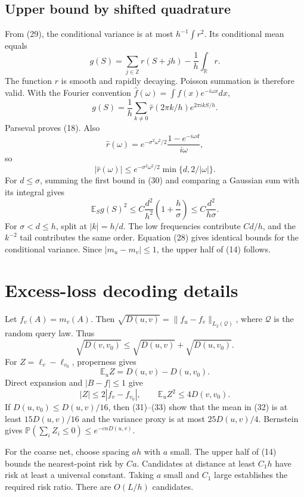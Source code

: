 \documentclass{article}
\theoremstyle{definition}
\theoremstyle{remark}
\newcommand{\E}{\mathbb E}
\newcommand{\Prb}{\mathbb P}
\newcommand{\R}{\mathbb R}
\newcommand{\1}{\mathbf 1}
\newcommand{\cQ}{\mathcal Q}
\begin{document}
\subsection{Upper bound by shifted quadrature}

From (29), the conditional variance is at most \(h^{-1}\int r^2\). Its conditional mean equals \[ g(S)=\sum_{j\in\mathbb Z}r(S+jh)-\frac1h\int_\R r. \] The function \(r\) is smooth and rapidly decaying. Poisson summation is therefore valid. With the Fourier convention \(\widehat f(\omega)=\int f(x)e^{-i\omega x}dx\), \[ g(S)=\frac1h\sum_{k\neq0}\widehat r(2\pi k/h)e^{2\pi i kS/h}. \] Parseval proves (18). Also \[ \widehat r(\omega) =e^{-\sigma^2\omega^2/2} \frac{1-e^{-i\omega d}}{i\omega}, \] so \[ |\widehat r(\omega)|\leq e^{-\sigma^2\omega^2/2}\min\{d,2/|\omega|\}. \tag{30} \] For \(d\leq\sigma\), summing the first bound in (30) and comparing a Gaussian sum with its integral gives \[ \E_Sg(S)^2\leq C\frac{d^2}{h^2}\left(1+\frac h\sigma\right) \leq C\frac{d^2}{h\sigma}. \] For \(\sigma<d\leq h\), split at \(|k|=h/d\). The low frequencies contribute \(Cd/h\), and the \(k^{-2}\) tail contributes the same order. Equation (28) gives identical bounds for the conditional variance. Since \(|m_u-m_v|\leq1\), the upper half of (14) follows.

\section{Excess-loss decoding details}\label{app:decoder}

Let \(f_v(A)=m_v(A)\). Then \(\sqrt{D(u,v)}=\|f_u-f_v\|_{L_2(\cQ)}\), where \(\cQ\) is the random query law. Thus \[ \sqrt{D(v,v_0)}\leq\sqrt{D(u,v)}+\sqrt{D(u,v_0)}. \tag{31} \] For \(Z=\ell_v-\ell_{v_0}\), properness gives \[ \E_u Z=D(u,v)-D(u,v_0). \tag{32} \] Direct expansion and \(|B-f|\leq1\) give \[ |Z|\leq2|f_v-f_{v_0}|,\qquad \E_uZ^2\leq4D(v,v_0). \tag{33} \] If \(D(u,v_0)\leq D(u,v)/16\), then (31)--(33) show that the mean in (32) is at least \(15D(u,v)/16\) and the variance proxy is at most \(25D(u,v)/4\). Bernstein gives \(\Prb(\sum_iZ_i\leq0)\leq e^{-cnD(u,v)}\).

For the coarse net, choose spacing \(a h\) with \(a\) small. The upper half of (14) bounds the nearest-point risk by \(Ca\). Candidates at distance at least \(C_1h\) have risk at least a universal constant. Taking \(a\) small and \(C_1\) large establishes the required risk ratio. There are \(O(L/h)\) candidates.
\end{document}
